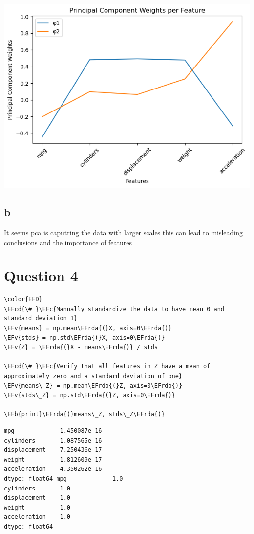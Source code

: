 \documentclass[11pt]{article}
\newcommand{\EFc}[1]{\textcolor{EFc}{#1}} %
\newcommand{\EFcd}[1]{\textcolor{EFcd}{#1}} %
\newcommand{\EFb}[1]{\textcolor{EFb}{#1}} %
\newcommand{\EFv}[1]{\textcolor{EFv}{#1}} %
\newcommand{\EFrda}[1]{\textcolor{EFrda}{#1}} %
\begin{document}
\begin{center}
\includegraphics[width=.9\linewidth]{plot.png}
\end{center}

\subsection*{b}
\label{sec:org964fb6e}
It seems pca is caputring the data with larger scales this can lead to misleading conclusions and the importance of features

\section*{Question 4}
\label{sec:org931dfad}


\begin{Code}
\begin{Verbatim}
\color{EFD}
\EFcd{\# }\EFc{Manually standardize the data to have mean 0 and standard deviation 1}
\EFv{means} = np.mean\EFrda{(}X, axis=0\EFrda{)}
\EFv{stds} = np.std\EFrda{(}X, axis=0\EFrda{)}
\EFv{Z} = \EFrda{(}X - means\EFrda{)} / stds

\EFcd{\# }\EFc{Verify that all features in Z have a mean of approximately zero and a standard deviation of one}
\EFv{means\_Z} = np.mean\EFrda{(}Z, axis=0\EFrda{)}
\EFv{stds\_Z} = np.std\EFrda{(}Z, axis=0\EFrda{)}

\EFb{print}\EFrda{(}means\_Z, stds\_Z\EFrda{)}
\end{Verbatim}
\end{Code}

\begin{verbatim}
mpg             1.450087e-16
cylinders      -1.087565e-16
displacement   -7.250436e-17
weight         -1.812609e-17
acceleration    4.350262e-16
dtype: float64 mpg             1.0
cylinders       1.0
displacement    1.0
weight          1.0
acceleration    1.0
dtype: float64
\end{verbatim}
\end{document}
